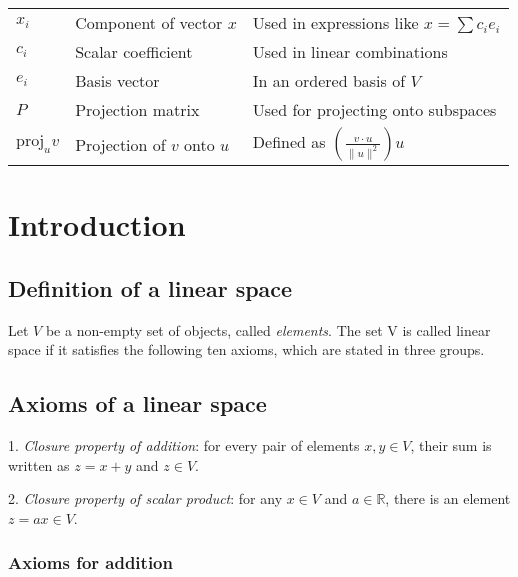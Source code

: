 \documentclass{book}
\begin{document}
\begin{tabular}{@{}llp{8.5cm}@{}}
    $x_i$               & Component of vector $x$      & Used in expressions like $x = \sum c_i e_i$                                             \\
    $c_i$               & Scalar coefficient           & Used in linear combinations                                                             \\
    $e_i$               & Basis vector                 & In an ordered basis of $V$                                                              \\
    $P$                 & Projection matrix            & Used for projecting onto subspaces                                                      \\
    $\mathrm{proj}_u v$ & Projection of $v$ onto $u$   & Defined as $\left(\frac{v \cdot u}{\|u\|^2}\right) u$                                   \\
\end{tabular}

\mainmatter
\chapter{Introduction}
\section{Definition of a linear space}
Let $V$ be a non-empty set of objects, called \textit{elements}. The set V is
called linear space if it satisfies the following ten axioms, which are stated
in three groups.

\section*{Axioms of a linear space}

\begin{list}{Axiom}{}
    \item 1.\textit{ Closure property of addition}: for every pair of elements $x,y\in V$, their sum is written as $z=x+y$ and $z\in V$.
    \item 2.\textit{ Closure property of scalar product}: for any $x\in V$ and $a\in\mathbb R$, there is an element $z=ax\in V$.
\end{list}

\subsection*{Axioms for addition}
\end{document}

